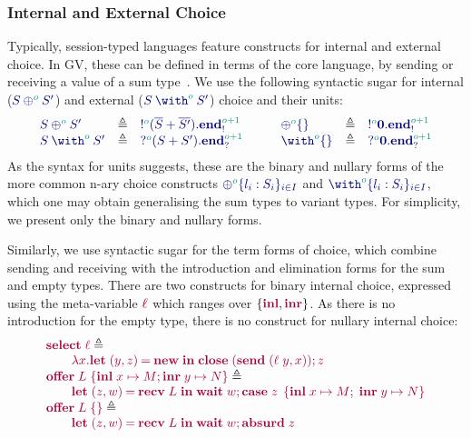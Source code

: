\documentclass[main.tex]{subfiles}
\begin{document}
\subsubsection*{Internal and External Choice}
Typically, session-typed languages feature constructs for internal and external choice. In GV, these can be defined in terms of the core language, by sending or receiving a value of a sum type~\cite{lindleymorris15}. We use the following syntactic sugar for internal ($\ty{\tyselect[\cs{o}]{S}{S'}}$) and external ($\ty{\tyoffer[\cs{o}]{S}{S'}}$) choice and their units:
\[
\begin{array}{lcl}
  \ty{\tyselect[\cs{o}]{S}{S'}}
  & \elabarrow & \ty{\tysend[\cs{o}]{(\tysum{\co{S}}{\co{S'}})}{\tyends[\cs{o+1}]}} \\
  \ty{\tyoffer[\cs{o}]{S}{S'}}
  & \elabarrow & \ty{\tyrecv[\cs{o}]{(\tysum{S}{S'})}{\tyendr[\cs{o+1}]}} \\
\end{array}
\qquad
\begin{array}{lcl}
  \ty{\tyselectemp[\cs{o}]}
  & \elabarrow & \ty{\tysend[\cs{o}]{\tyvoid}{\tyends[\cs{o+1}]}} \\
  \ty{\tyofferemp[\cs{o}]}
  & \elabarrow & \ty{\tyrecv[\cs{o}]{\tyvoid}{\tyendr[\cs{o+1}]}} \\
\end{array}
\]
As the syntax for units suggests, these are the binary and nullary forms of the more common n-ary choice constructs $\ty{{\oplus}^{\cs{o}}\{l_i:S_i\}_{i\in{I}}}$ and $\ty{{\with}^{\cs{o}}\{l_i:S_i\}_{i\in{I}}}$, which one may obtain generalising the sum types to variant types. For simplicity, we present only the binary and nullary forms.

Similarly, we use syntactic sugar for the term forms of choice, which combine sending and receiving with the introduction and elimination forms for the sum and empty types. There are two constructs for binary internal choice, expressed using the meta-variable $\tm{\ell}$ which ranges over $\{\tm{\labinl},\tm{\labinr}\}$. As there is no introduction for the empty type, there is no construct for nullary internal choice:
\[
\begin{array}{l}
  \tm{\select{\ell}}\elabarrow \\
  \qquad\tm{\lambda x.\letpair{y}{z}{\new}{\andthen{\close\;(\send\;{\pair{\ell\;y}{x}})}{z}}} \\
  \tm{\offer{L}{x}{M}{y}{N}}\elabarrow \\
  \qquad\tm{\letpair{z}{w}{\recv\;{L}}{\andthen{\wait\;{w}}{\casesum{z}{x}{M}{y}{N}}}} \\
  \tm{\offeremp{L}}\elabarrow \\
  \qquad\tm{\letpair{z}{w}{\recv\;L}{\andthen{\wait\;{w}}{\absurd{z}}}}
\end{array}
\]
\end{document}
